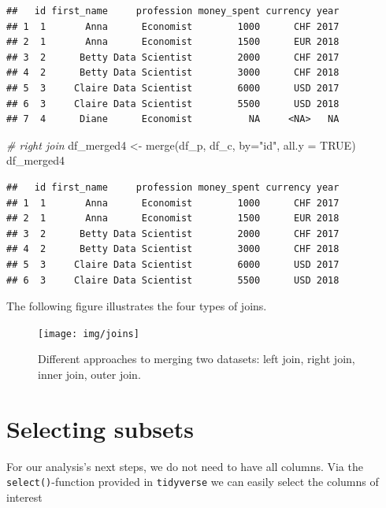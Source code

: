 \documentclass[
  12pt,
]{style/krantz}
\newenvironment{Shaded}{\begin{snugshade}}{\end{snugshade}}
\newcommand{\AttributeTok}[1]{\textcolor[rgb]{0.77,0.63,0.00}{#1}}
\newcommand{\CommentTok}[1]{\textcolor[rgb]{0.56,0.35,0.01}{\textit{#1}}}
\newcommand{\ConstantTok}[1]{\textcolor[rgb]{0.00,0.00,0.00}{#1}}
\newcommand{\FunctionTok}[1]{\textcolor[rgb]{0.00,0.00,0.00}{#1}}
\newcommand{\NormalTok}[1]{#1}
\newcommand{\OtherTok}[1]{\textcolor[rgb]{0.56,0.35,0.01}{#1}}
\newcommand{\StringTok}[1]{\textcolor[rgb]{0.31,0.60,0.02}{#1}}
\begin{document}
\begin{verbatim}
##   id first_name     profession money_spent currency year
## 1  1       Anna      Economist        1000      CHF 2017
## 2  1       Anna      Economist        1500      EUR 2018
## 3  2      Betty Data Scientist        2000      CHF 2017
## 4  2      Betty Data Scientist        3000      CHF 2018
## 5  3     Claire Data Scientist        6000      USD 2017
## 6  3     Claire Data Scientist        5500      USD 2018
## 7  4      Diane      Economist          NA     <NA>   NA
\end{verbatim}

\begin{Shaded}
\begin{Highlighting}[]
\CommentTok{\# right join}
\NormalTok{df\_merged4 }\OtherTok{\textless{}{-}} \FunctionTok{merge}\NormalTok{(df\_p, df\_c, }\AttributeTok{by=}\StringTok{"id"}\NormalTok{, }\AttributeTok{all.y =} \ConstantTok{TRUE}\NormalTok{)}
\NormalTok{df\_merged4}
\end{Highlighting}
\end{Shaded}

\begin{verbatim}
##   id first_name     profession money_spent currency year
## 1  1       Anna      Economist        1000      CHF 2017
## 2  1       Anna      Economist        1500      EUR 2018
## 3  2      Betty Data Scientist        2000      CHF 2017
## 4  2      Betty Data Scientist        3000      CHF 2018
## 5  3     Claire Data Scientist        6000      USD 2017
## 6  3     Claire Data Scientist        5500      USD 2018
\end{verbatim}

The following figure illustrates the four types of joins.

\begin{figure}

{\centering \texttt{[image: img/joins]} 

}

\caption{Different approaches to merging two datasets: left join, right join, inner join, outer join.}\label{fig:joins}
\end{figure}



\hypertarget{selecting-subsets}{%
\section{Selecting subsets}\label{selecting-subsets}}

For our analysis's next steps, we do not need to have all columns. Via the \texttt{select()}-function provided in \texttt{tidyverse} we can easily select the columns of interest
\end{document}
